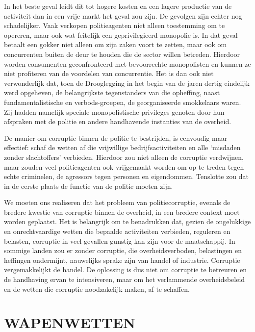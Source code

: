 \documentclass[
  a5paper,
  smalldemyvopaper,10pt,twoside,onecolumn,openright,extrafontsizes,hidelinks]{memoir}
\begin{document}
In het beste geval leidt dit tot hogere kosten en een lagere productie
van de activiteit dan in een vrije markt het geval zou zijn. De gevolgen
zijn echter nog schadelijker. Vaak verkopen politieagenten niet alleen
toestemming om te opereren, maar ook wat feitelijk een geprivilegieerd
monopolie is. In dat geval betaalt een gokker niet alleen om zijn zaken
voort te zetten, maar ook om concurrenten buiten de deur te houden die
de sector willen betreden. Hierdoor worden consumenten geconfronteerd
met bevoorrechte monopolisten en kunnen ze niet profiteren van de
voordelen van concurrentie. Het is dan ook niet verwonderlijk dat, toen
de Drooglegging in het begin van de jaren dertig eindelijk werd
opgeheven, de belangrijkste tegenstanders van die opheffing, naast
fundamentalistische en verbods-groepen, de georganiseerde smokkelaars
waren. Zij hadden namelijk speciale monopolistische privileges genoten
door hun afspraken met de politie en andere handhavende instanties van
de overheid.

De manier om corruptie binnen de politie te bestrijden, is eenvoudig
maar effectief: schaf de wetten af die vrijwillige bedrijfsactiviteiten
en alle `misdaden zonder slachtoffers' verbieden. Hierdoor zou niet
alleen de corruptie verdwijnen, maar zouden veel politieagenten ook
vrijgemaakt worden om op te treden tegen echte criminelen, de agressors
tegen personen en eigendommen. Tenslotte zou dat in de eerste plaats de
functie van de politie moeten zijn.

We moeten ons realiseren dat het probleem van politiecorruptie, evenals
de bredere kwestie van corruptie binnen de overheid, in een bredere
context moet worden geplaatst. Het is belangrijk om te benadrukken dat,
gezien de ongelukkige en onrechtvaardige wetten die bepaalde
activiteiten verbieden, reguleren en belasten, corruptie in veel
gevallen gunstig kan zijn voor de maatschappij. In sommige landen zou er
zonder corruptie, die overheidsverboden, belastingen en heffingen
ondermijnt, nauwelijks sprake zijn van handel of industrie. Corruptie
vergemakkelijkt de handel. De oplossing is dus niet om corruptie te
betreuren en de handhaving ervan te intensiveren, maar om het
verlammende overheidsbeleid en de wetten die corruptie noodzakelijk
maken, af te schaffen.

\section{WAPENWETTEN}\label{wapenwetten}
\end{document}
